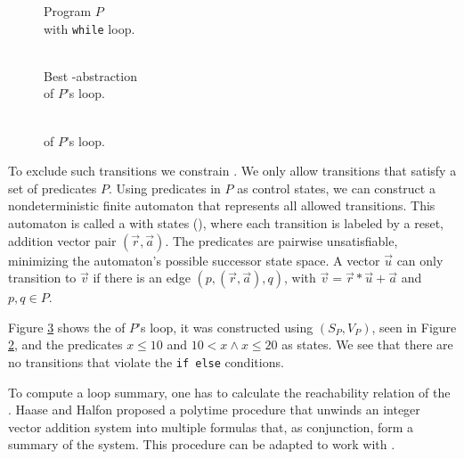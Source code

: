 \begin{minipage}[t]{0.3\linewidth} \centering
	\begin{figure}[H]
		
		\caption{Program $P$ \\ with \texttt{while} loop.}
		\label{code}
	\end{figure}
\end{minipage}
\begin{minipage}[t]{0.35\linewidth} \centering
	\begin{figure}[H]
			
			\caption{\\ Best \qvasr-abstraction \\ of $P$'s loop.}
			\label{vasr}
	\end{figure}
\end{minipage}
\begin{minipage}[t]{0.3\linewidth} \centering
	\begin{figure}[H]
		
		\caption{\\ \qvasrs of $P$'s loop.}
		\label{vasrs}
	\end{figure}
\end{minipage}
\vspace*{1cm}

To exclude such transitions we constrain \qvasr. We only allow transitions that satisfy a set of predicates $P$. Using predicates in $P$ as control states, we can construct a nondeterministic finite automaton that represents all allowed transitions. This automaton is called a \qvasr with states (\qvasrs), where each transition is labeled by a reset, addition vector pair $(\vec{r}, \vec{a})$. The predicates are pairwise unsatisfiable, minimizing the automaton's possible successor state space. A vector $\vec{u}$ can only transition to $\vec{v}$ if there is an edge $(p, (\vec{r}, \vec{a}), q)$, with $\vec{v} = \vec{r} * \vec{u} + \vec{a}$ and $p, q \in P$. \par
Figure \ref{vasrs} shows the \qvasrs of $P$'s loop, it was constructed using $(S_P, V_P)$, seen in Figure \ref{vasr}, and the predicates $x \leq 10$ and $10 < x \land x \leq 20$ as states. We see that there are no transitions that violate the \texttt{if else} conditions. \par
To compute a loop summary, one has to calculate the reachability relation of the \qvasrs. Haase and Halfon \cite{DBLP:conf/rp/HaaseH14} proposed a polytime procedure that unwinds an integer vector addition system into multiple formulas that, as conjunction, form a summary of the system. This procedure can be adapted to work with \qvasrs. \\ \par

